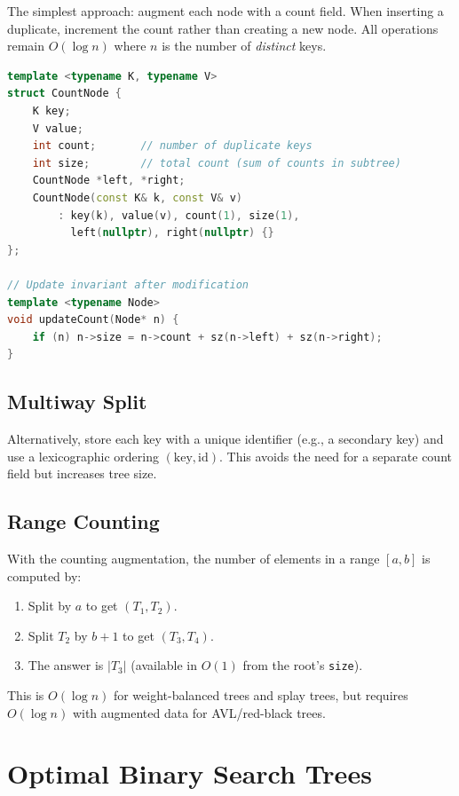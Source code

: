 The simplest approach: augment each node with a count field. When inserting a duplicate, increment the count rather than creating a new node. All operations remain $O(\log n)$ where $n$ is the number of \emph{distinct} keys.

\begin{lstlisting}[language=C++]
template <typename K, typename V>
struct CountNode {
    K key;
    V value;
    int count;       // number of duplicate keys
    int size;        // total count (sum of counts in subtree)
    CountNode *left, *right;
    CountNode(const K& k, const V& v)
        : key(k), value(v), count(1), size(1),
          left(nullptr), right(nullptr) {}
};

// Update invariant after modification
template <typename Node>
void updateCount(Node* n) {
    if (n) n->size = n->count + sz(n->left) + sz(n->right);
}
\end{lstlisting}

\subsection{Multiway Split}
\label{sec:multiway-split}

Alternatively, store each key with a unique identifier (e.g., a secondary key) and use a lexicographic ordering $(\text{key}, \text{id})$. This avoids the need for a separate count field but increases tree size.

\subsection{Range Counting}
\label{sec:range-counting}

With the counting augmentation, the number of elements in a range $[a, b]$ is computed by:
\begin{enumerate}
    \item Split by $a$ to get $(T_1, T_2)$.
    \item Split $T_2$ by $b+1$ to get $(T_3, T_4)$.
    \item The answer is $|T_3|$ (available in $O(1)$ from the root's \texttt{size}).
\end{enumerate}

This is $O(\log n)$ for weight-balanced trees and splay trees, but requires $O(\log n)$ with augmented data for AVL/red-black trees.

\section{Optimal Binary Search Trees}
\label{sec:optimal-bst}

